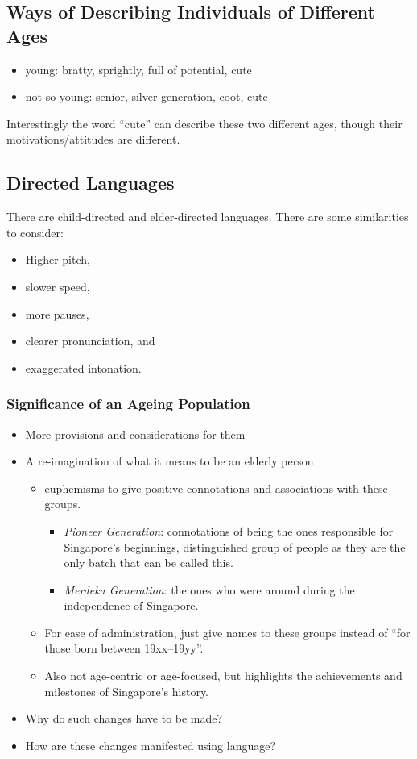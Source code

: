 \documentclass[../main.tex]{subfiles}
\begin{document}
\subsection{Ways of Describing Individuals of Different Ages}
\begin{itemize}
	\item young: bratty, sprightly, full of potential, cute
	\item not so young: senior, silver generation, coot, cute
\end{itemize}

Interestingly the word ``cute'' can describe these two different ages, though their motivations/attitudes are different.

\subsection{Directed Languages}
There are child-directed and elder-directed languages. There are some similarities to consider:
\begin{itemize}
	\item Higher pitch,
	\item slower speed,
	\item more pauses,
	\item clearer pronunciation, and
	\item exaggerated intonation.
\end{itemize}

\subsubsection{Significance of an Ageing Population}
\begin{itemize}
	\item More provisions and considerations for them
	\item A re-imagination of what it means to be an elderly person \begin{itemize}
		\item euphemisms to give positive connotations and associations with these groups. \begin{itemize}
			\item \textit{Pioneer Generation}: connotations of being the ones responsible for Singapore's beginnings, distinguished group of people as they are the only batch that can be called this.
			\item \textit{Merdeka Generation}: the ones who were around during the independence of Singapore.
	\end{itemize}
		\item For ease of administration, just give names to these groups instead of ``for those born between 19xx--19yy''.
		\item Also not age-centric or age-focused, but highlights the achievements and milestones of Singapore's history.
	\end{itemize}
	\item Why do such changes have to be made?
	\item How are these changes manifested using language?
\end{itemize}
\end{document}
